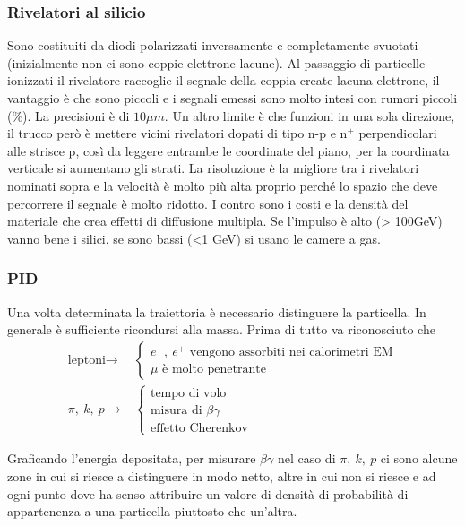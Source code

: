 \documentclass[12pt]{book}
\begin{document}
\subsubsection{Rivelatori al silicio}
Sono costituiti da diodi polarizzati inversamente e completamente svuotati (inizialmente non ci sono coppie elettrone-lacune). Al passaggio di particelle ionizzati il rivelatore raccoglie il segnale della coppia create lacuna-elettrone, il vantaggio è che sono piccoli e i segnali emessi sono molto intesi con rumori piccoli (\%). La precisioni è di $10 \mu m$. Un altro limite è che funzioni in una sola direzione, il trucco però è mettere vicini rivelatori dopati di tipo n-p e n$^+$ perpendicolari alle strisce p, così da leggere entrambe le coordinate del piano, per la coordinata verticale si aumentano gli strati. La risoluzione è la migliore tra i rivelatori nominati sopra e la velocità è molto più alta proprio perché lo spazio che deve percorrere il segnale è molto ridotto. I contro sono i costi e la densità del materiale che crea effetti di diffusione multipla. Se l'impulso è alto (> 100GeV) vanno bene i silici, se sono bassi (<1 GeV) si usano le camere a gas.

\subsubsection{PID}
Una volta determinata la traiettoria è necessario distinguere la particella. In generale è sufficiente ricondursi alla massa. Prima di tutto va riconosciuto che
\begin{align*}
	\text{leptoni} \longrightarrow &\begin{cases}
	e^-,\ e^+ \text{ vengono assorbiti nei calorimetri EM}\\
	\mu \text{ è molto penetrante}
\end{cases}\\
\pi,\  k, \ p \longrightarrow & \begin{cases}
	\text{tempo di volo}\\
	\text{misura di } \beta \gamma \\
	\text{effetto Cherenkov}
\end{cases}
\end{align*}




Graficando l'energia depositata, per misurare $\beta \gamma$ nel caso di $\pi, \ k, \ p$ ci sono alcune zone in cui si riesce a distinguere in modo netto, altre in cui non si riesce e ad ogni punto dove ha senso attribuire un valore di densità di probabilità di appartenenza a una particella piuttosto che un'altra.
\end{document}
